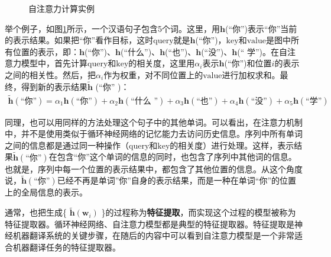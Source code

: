 \begin{figure}[htp]
\centering

\caption{自注意力计算实例}
\label{fig:6-38}
\end{figure}

\parinterval 举个例子，如图\ref{fig:6-38}所示，一个汉语句子包含5个词。这里，用$\mathbf{h}$(``你'')表示``你''当前的表示结果。如果把``你''看作目标，这时$\mathrm{query}$就是$\mathbf{h}$(``你'')，$\mathrm{key}$和$\mathrm{value}$是图中所有位置的表示，即：{$\mathbf{h}$(``你'')、$\mathbf{h}$(``什么'')、$\mathbf{h}$(``也'')、$\mathbf{h}$(``没'')、$\mathbf{h}$(`` 学'')}。在自注意力模型中，首先计算$\mathrm{query}$和$\mathrm{key}$的相关度，这里用$\alpha_i$表示$\mathbf{h}$(``你'')和位置$i$的表示之间的相关性。然后，把$\alpha_i$作为权重，对不同位置上的$\mathrm{value}$进行加权求和。最终，得到新的表示结果$\tilde{\mathbf{h}}$ (``你'' )：
\begin{eqnarray}
\tilde{\mathbf{h}} (\textrm{``你''} ) = \alpha_1 {\mathbf{h}} (\textrm{``你''} )
+ \alpha_2 {\mathbf{h}} (\textrm{``什么 ''})
+ \alpha_3 {\mathbf{h}} (\textrm{``也''} )
+ \alpha_4 {\mathbf{h}} (\textrm{``没''} )
+\alpha_5 {\mathbf{h}} (\textrm{``学''} )
\label{eq:6-42}
\end{eqnarray}

\parinterval 同理，也可以用同样的方法处理这个句子中的其他单词。可以看出，在注意力机制中，并不是使用类似于循环神经网络的记忆能力去访问历史信息。序列中所有单词之间的信息都是通过同一种操作（$\mathrm{query}$和$\mathrm{key}$的相关度）进行处理。这样，表示结果$\tilde{\mathbf{h}} (\textrm{``你''})$在包含``你''这个单词的信息的同时，也包含了序列中其他词的信息。也就是，序列中每一个位置的表示结果中，都包含了其他位置的信息。从这个角度说，$\tilde{\mathbf{h}} (\textrm{``你''})$已经不再是单词''你''自身的表示结果，而是一种在单词``你''的位置上的全局信息的表示。

\parinterval 通常，也把生成\{ $\tilde{\mathbf{h}}(\mathbf{w}_i)$ \}的过程称为{\small\sffamily\bfseries{特征提取}}，而实现这个过程的模型被称为特征提取器。循环神经网络、自注意力模型都是典型的特征提取器。特征提取是神经机器翻译系统的关键步骤，在随后的内容中可以看到自注意力模型是一个非常适合机器翻译任务的特征提取器。


